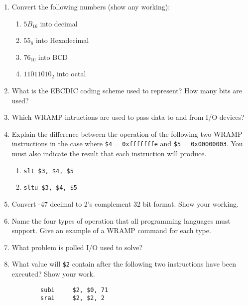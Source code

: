 \documentclass[a4paper,10pt]{article}
\begin{document}
\begin{enumerate}

\item Convert the following numbers (show any working):

\begin{enumerate}
	
	\item  $5B_{16}$ into decimal \\
	
	\item  $55_{8}$ into Hexadecimal \\
	
	\item  $76_{10}$ into BCD \\
	
	\item  $11011010_{2}$ into octal \\
	
\end{enumerate}

\item What is the EBCDIC coding scheme used to represent? How many bits are used?

\item Which WRAMP intructions are used to pass data to and from I/O devices?

\item Explain the difference between the operation of the following two WRAMP instructions
in the case where \texttt{\$4} = \texttt{0xfffffffe} and \texttt{\$5} = \texttt{0x00000003}.
You must also indicate the result that each instruction will produce.

\begin{enumerate}
  \item \texttt{slt \$3, \$4, \$5}
  \item \texttt{sltu \$3, \$4, \$5}
\end{enumerate}

\item Convert -47 decimal to 2's complement 32 bit format. Show your working.

\item Name the four types of operation that all programming languages must
support.  Give an example of a WRAMP command for each type.

\item What problem is polled I/O used to solve?

\item What value will \texttt{\$2} contain after the following two instructions have been executed? Show your work.
\begin{verbatim}
        subi     $2, $0, 71
        srai     $2, $2, 2
\end{verbatim}


\end{enumerate}
\end{document}
